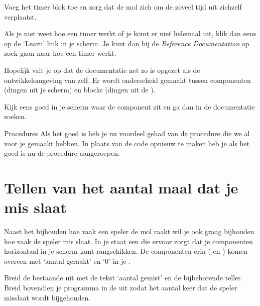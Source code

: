  
\begin{opgave}
    \opgVraag
	Voeg het timer blok toe en zorg dat de mol zich om de zoveel tijd uit zichzelf verplaatst.
\end{opgave}

Als je niet weet hoe een timer werkt of je komt er niet helemaal uit, klik dan eens op de `Learn' link in je  scherm. Je kunt dan bij de \emph{Reference Documentation} op zoek gaan naar hoe een timer werkt.

Hopelijk valt je op dat de documentatie net zo is opgezet als de ontwikkelomgeving van \ai zelf. Er wordt onderscheid gemaakt tussen componenten (dingen uit je  scherm) en blocks (dingen uit de ).

Kijk eens goed in je  scherm waar de  component zit en ga dan in de documentatie zoeken.

\begin{derivation}{Procedures}
Als het goed is heb je nu voordeel gehad van de procedure die we al voor je gemaakt hebben. In plaats van de code opnieuw te maken heb je als het goed is nu de procedure aangeroepen.
\end{derivation}


\section{Tellen van het aantal maal dat je mis slaat}
Naast het bijhouden hoe vaak een speler de mol raakt wil je ook graag bijhouden hoe vaak de speler mis slaat. In je  staat een  die ervoor zorgt dat je componenten horizontaal in je scherm kunt rangschikken. De componenten erin ( en ) komen overeen met `aantal geraakt' en `0' in je .

\begin{opgave}
    \opgVraag
	Breid de bestaande  uit met de tekst `aantal gemist' en de bijbehorende teller. Breid bovendien je programma in de  uit zodat het aantal keer dat de speler misslaat wordt bijgehouden. 
\end{opgave}


